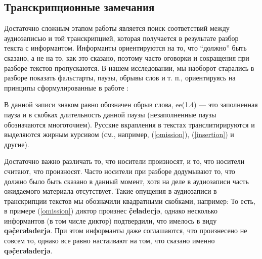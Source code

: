 \subsection{Транскрипционные замечания}
\noindent Достаточно сложным этапом работы является поиск соответствий между аудиозаписью и той транскрипцией, которая получается в результате разбор текста с информантом. Информанты ориентируются на то, что ``должно'' быть сказано, а не на то, как это сказано, поэтому часто оговорки и сокращения при разборе текстов пропускаются. В нашем исследовании, мы наоборот старались в разборе показать фальстарты, паузы, обрывы слов и т. п., ориентируясь на принципы сформулированные в работе \citep{kibrik14}:
\par В данной записи знаком равно обозначен обрыв слова, ee(1.4) --- это заполненная пауза и в скобках длительность данной паузы (незаполненные паузы обозначаются многоточием). Русские вкрапления в текстах транслитирируются и выделяются жирным курсивом (см., например, (\ref{omission}), (\ref{insertion}) и другие).
\par Достаточно важно различать то, что носители произносят, и то, что носители считают, что произносят. Часто носители при разборе додумывают то, что должно было быть сказано в данный момент, хотя на деле в аудиозаписи часть ожидаемого материала отсутствует. Такие опущения в аудиозаписи в транскрипции текстов мы обозначили квадратными скобками, например:
То есть, в примере (\ref{omission}) диктор произнес \textbf{č̣eɬaderjə}, однако несколько информантов (в том числе диктор) подтвердили, что имелось в виду \textbf{qəč̣erəɬaderjə}. При этом информанты даже соглашаются, что произнесено не совсем то, однако все равно настаивают  на том, что сказано именно \textbf{qəč̣erəɬaderjə}.
